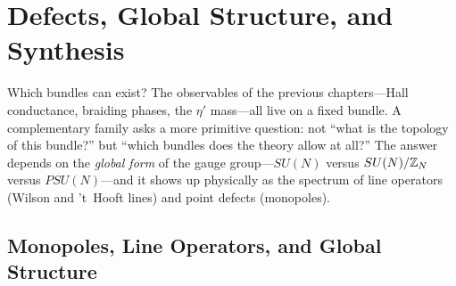 %

\section{Defects, Global Structure, and Synthesis}
\label{sec:defects-synthesis}

Which bundles can exist? The observables of the previous chapters---Hall conductance, braiding phases, the $\eta'$ mass---all live on a fixed bundle. A complementary family asks a more primitive question: not ``what is the topology of this bundle?'' but ``which bundles does the theory allow at all?'' The answer depends on the \emph{global form} of the gauge group---$SU(N)$ versus $SU(N)/\mathbb{Z}_N$ versus $PSU(N)$---and it shows up physically as the spectrum of line operators (Wilson and 't~Hooft lines) and point defects (monopoles).

\subsection{Monopoles, Line Operators, and Global Structure}
\label{subsec:monopoles-line-operators}

